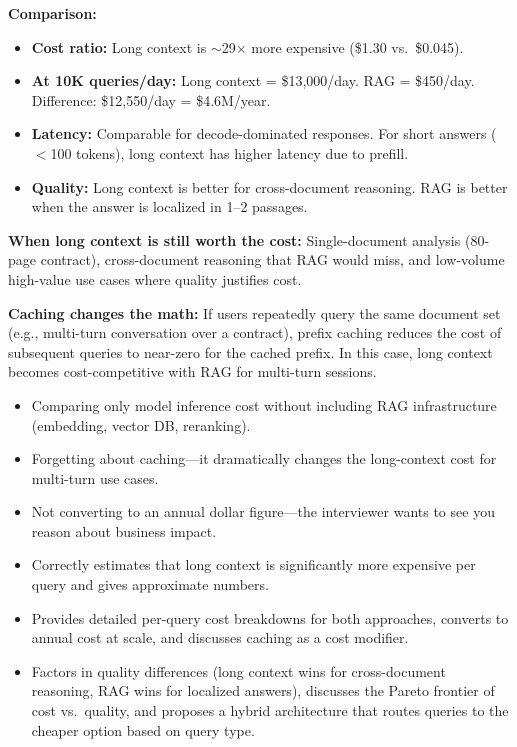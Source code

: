 \begin{interviewq}
\textbf{Comparison:}
\begin{itemize}
    \item \textbf{Cost ratio:} Long context is $\sim$29$\times$ more expensive (\$1.30 vs.\ \$0.045).
    \item \textbf{At 10K queries/day:} Long context = \$13,000/day. RAG = \$450/day. Difference: \$12,550/day = \$4.6M/year.
    \item \textbf{Latency:} Comparable for decode-dominated responses. For short answers ($<$100 tokens), long context has higher latency due to prefill.
    \item \textbf{Quality:} Long context is better for cross-document reasoning. RAG is better when the answer is localized in 1--2 passages.
\end{itemize}

\textbf{When long context is still worth the cost:} Single-document analysis (80-page contract), cross-document reasoning that RAG would miss, and low-volume high-value use cases where quality justifies cost.

\textbf{Caching changes the math:} If users repeatedly query the same document set (e.g., multi-turn conversation over a contract), prefix caching reduces the cost of subsequent queries to near-zero for the cached prefix. In this case, long context becomes cost-competitive with RAG for multi-turn sessions.

\redflags
\begin{itemize}
    \item Comparing only model inference cost without including RAG infrastructure (embedding, vector DB, reranking).
    \item Forgetting about caching---it dramatically changes the long-context cost for multi-turn use cases.
    \item Not converting to an annual dollar figure---the interviewer wants to see you reason about business impact.
\end{itemize}


\goodgreat
\begin{itemize}
    \item {} Correctly estimates that long context is significantly more expensive per query and gives approximate numbers.
    \item {} Provides detailed per-query cost breakdowns for both approaches, converts to annual cost at scale, and discusses caching as a cost modifier.
    \item {} Factors in quality differences (long context wins for cross-document reasoning, RAG wins for localized answers), discusses the Pareto frontier of cost vs.\ quality, and proposes a hybrid architecture that routes queries to the cheaper option based on query type.
\end{itemize}


\end{interviewq}
